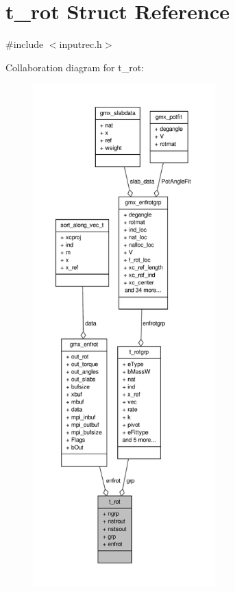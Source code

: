 \hypertarget{structt__rot}{\section{t\-\_\-rot \-Struct \-Reference}
\label{structt__rot}
}


{\ttfamily \#include $<$inputrec.\-h$>$}



\-Collaboration diagram for t\-\_\-rot\-:
\nopagebreak
\begin{figure}[H]
\begin{center}
\leavevmode
\includegraphics[height=550pt]{structt__rot__coll__graph}
\end{center}
\end{figure}
